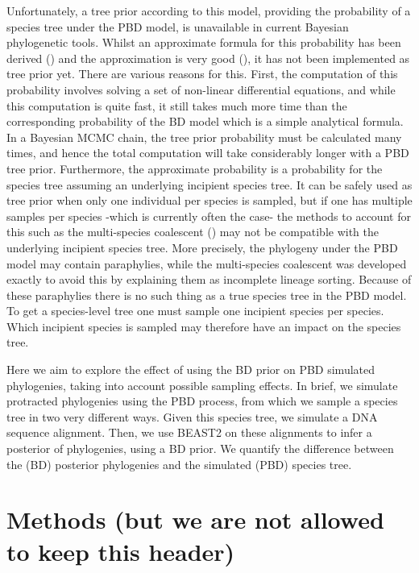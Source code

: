 \documentclass{article}
\begin{document}
Unfortunately, a tree prior according to this model, 
providing the probability of a species tree under the PBD model, 
is unavailable in current Bayesian phylogenetic tools. 
Whilst an approximate formula for this probability has been derived (\cite{lambert_et_al_2015}) 
and the approximation is very good (\cite{simonet_et_al_2018}), 
it has not been implemented as tree prior yet. 
There are various reasons for this. 
First, the computation of this probability involves solving a set of 
non-linear differential equations, and while this computation is quite fast, 
it still takes much more time than the corresponding probability 
of the BD model which is a simple analytical formula. 
In a Bayesian MCMC chain, the tree prior probability must be calculated many times, 
and hence the total computation will take considerably longer with a PBD tree prior. 
Furthermore, the approximate probability is a probability for the species tree 
assuming an underlying incipient species tree. 
It can be safely used as tree prior when only one individual per species is sampled, 
but if one has multiple samples per species -which is currently often the case- the methods 
to account for this such as the multi-species coalescent (\cite{heled_and_drummond_2009}) 
may not be compatible with the underlying incipient species tree. 
More precisely, the phylogeny under the PBD model may contain paraphylies, 
while the multi-species coalescent was developed exactly to avoid 
this by explaining them as incomplete lineage sorting. 
Because of these paraphylies there is no such thing as a true species tree in the PBD model. 
To get a species-level tree one must sample one incipient species per species. 
Which incipient species is sampled may therefore have an impact on the species tree.

Here we aim to explore the effect of using the
BD prior on PBD simulated phylogenies, taking into account possible sampling effects. 
In brief, we simulate protracted phylogenies using the PBD process,
from which we sample a species tree in two very different ways. Given this species tree, 
we simulate a DNA sequence alignment. Then, we use BEAST2 on these alignments
to infer a posterior of phylogenies, using a BD prior. We quantify the difference
between the (BD) posterior phylogenies and the simulated (PBD) species tree.

\section{Methods (but we are not allowed to keep this header)}
\end{document}
